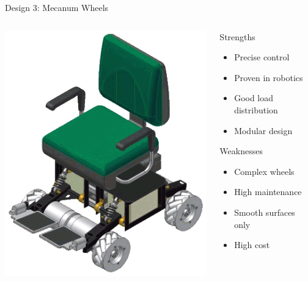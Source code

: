 \documentclass[aspectratio=169]{beamer}
\begin{document}
\begin{frame}{Design 3: Mecanum Wheels}
\begin{columns}[c]
\begin{column}{0.5\textwidth}
\includegraphics[height=0.6\textheight]{pdpAssets/MecanumWheelSystem.png}
\end{column}

\begin{column}{0.48\textwidth}
\begin{block}{Strengths}
\begin{itemize}
    \item Precise control
    \item Proven in robotics
    \item Good load distribution
    \item Modular design
\end{itemize}
\end{block}

\begin{block}{Weaknesses}
\begin{itemize}
    \item Complex wheels
    \item High maintenance
    \item Smooth surfaces only
    \item High cost
\end{itemize}
\end{block}
\end{column}
\end{columns}
\end{frame}
\end{document}
